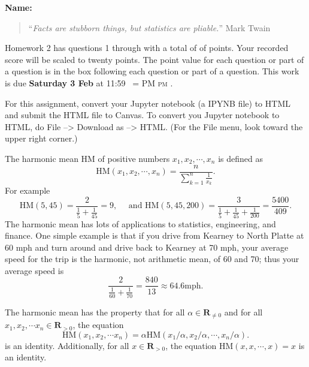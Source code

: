 \documentclass[12pt,fleqn]{exam}
\makeatletter
\newcommand{\reals}{\mathbf{R}}
\newcommand{\HM}{\mathrm{HM}}
\newcommand{\quiz}{2}
\newcommand{\term}{Spring}
\DeclareRobustCommand{\maybefakesc}[1]{%
  \ifnum\pdfstrcmp{\f@series}{\bfdefault}=\z@
    {\fontsize{\dimexpr0.8\dimexpr\f@size pt\relax}{0}\selectfont\uppercase{#1}}%
  \else
    \textsc{#1}%
  \fi
}
\newcommand\PM{\,\maybefakesc{pm}\xspace}
\makeatother
\begin{document}
\large
\vspace{0.1in}
\noindent{}
{\bf Name:}  \\
\noindent \makebox[3.0truein][l]{\textbf{Homework \quiz, \term \/ \the\year}}
\vspace{0.1in}

\begin{quote}
“\emph{Facts are stubborn things, but statistics are pliable.}”  \hfill {\sc Mark Twain} 

\end{quote}
\noindent  Homework \quiz\/  has questions 1 through  \numquestions \/ with a total of of  \numpoints\/  points. 
Your recorded score will be scaled to twenty points. The point
value for each question or part of a question is in the box following each question or part of a question.
This work is due \textbf{Saturday 3 Feb  } at 11:59 \PM.  

For this assignment, convert your  Jupyter notebook (a IPYNB file)
 to HTML and submit the HTML file to Canvas. To convert you Jupyter notebook to HTML, do File --> Download as --> HTML. (For the File menu, look toward the 
 upper right corner.)


\vspace{0.1in}
The harmonic mean $\HM$ of positive numbers $x_1, x_2, \cdots, x_n$ is defined as
\begin{equation*}
  \HM(x_1, x_2, \cdots, x_n) = \frac{n}{\sum_{k=1}^n \frac{1}{x_k}}.
\end{equation*}
For example
\begin{equation*}
  \HM(5,45) = \frac{2}{\frac{1}{5} + \frac{1}{45}} = 9, \quad  \text{ and }  \HM(5,45, 200) = \frac{3}{\frac{1}{5} + \frac{1}{45} +\frac{1}{200}} = \frac{5400}{409}.
\end{equation*}
The harmonic mean has lots of applications to statistics, engineering, and finance.   One simple example is that if
you drive from Kearney to North Platte at 60 mph and turn around and drive back to Kearney at 70 mph, your average speed for the trip is the harmonic, not arithmetic mean, of 60 and 70; thus your average speed is 
\begin{equation*}
\frac{2}{\frac{1}{60} + \frac{1}{70}} = \frac{840}{13} \approx 64.6 \mathrm{mph}.
\end{equation*}

The harmonic mean has the property that for all $\alpha \in \reals_{\neq 0}$ and for all $x_1, x_2, \cdots x_n \in \reals_{> 0}$,
the equation
\begin{equation*}
  \HM(x_1, x_2, \cdots x_n) =\alpha  \HM(x_1 / \alpha , x_2 /\alpha , \cdots, x_n/\alpha ).
\end{equation*}
is an identity. Additionally, for all $x \in \reals_{>0}$, the equation
$  \HM(x,x, \cdots ,x ) =x$ is an identity.
\end{document}
